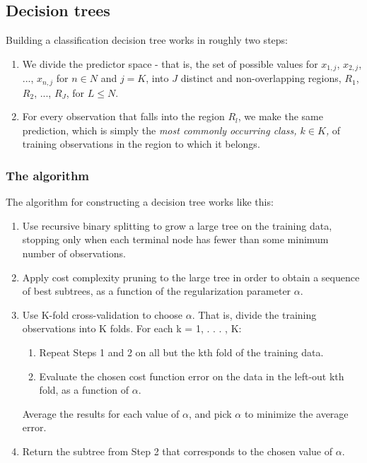 \documentclass[parskip=half]{scrartcl}
\theoremstyle{definition}
\theoremstyle{remark}
\begin{document}
\subsection{Decision trees}
Building a classification decision tree works in roughly two steps:

\begin{enumerate}[label=(\arabic*)]
	\item We divide the predictor space - that is, the set of possible values for $x_{1,j}$, $x_{2,j}$, ..., $x_{n,j}$ for $n \in N$ and $j = K$, into $J$ distinct and non-overlapping regions, $R_1$, $R_2$, ..., $R_J$, for $L \leq N$.
	\item For every observation that falls into the region $R_l$, we make the same prediction, which is simply the \emph{most commonly occurring class, $k \in K$,} of training observations in the region to which it belongs.
\end{enumerate}

\subsubsection{The algorithm}
The algorithm for constructing a decision tree works like this:

\begin{enumerate}[label=(\arabic*)]
	\item Use recursive binary splitting to grow a large tree on the training
	data, stopping only when each terminal node has fewer than some
	minimum number of observations.
	\item Apply cost complexity pruning to the large tree in order to obtain a
	sequence of best subtrees, as a function of the regularization parameter $\alpha$.
	\item Use K-fold cross-validation to choose $\alpha$. That is, divide the training
	observations into K folds. For each k = 1, . . . , K:
	\begin{enumerate}
	\item Repeat Steps 1 and 2 on all but the kth fold of the training data.
	\item Evaluate the chosen cost function error on the data in the
	left-out kth fold, as a function of $\alpha$.
	\end{enumerate}
	Average the results for each value of $\alpha$, and pick $\alpha$ to minimize the
	average error.
	\item Return the subtree from Step 2 that corresponds to the chosen value
	of $\alpha$.
\end{enumerate}
\end{document}
